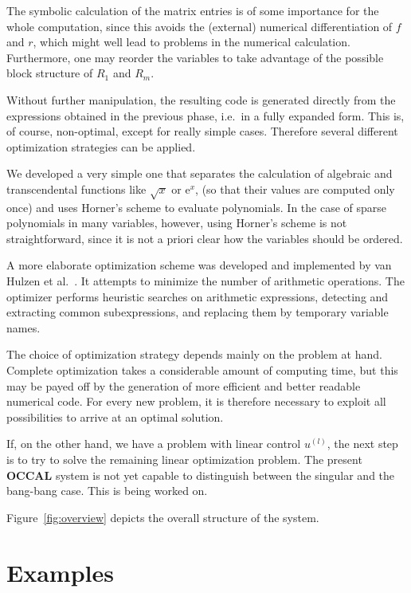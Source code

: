 \documentclass[12pt,a4paper]{article}
\newcommand{\OCCAL}{{\sf\bf OCCAL}}
\begin{document}
The symbolic calculation of the matrix entries is of some importance
for the whole computation, since this avoids the (external) numerical
differentiation of $f$ and $r$, which might well lead to problems in
the numerical calculation.  Furthermore, one may reorder the variables
to take advantage of the possible block structure of $R_{1}$ and
$R_{m}$.

Without further manipulation, the resulting code is generated directly
from the expressions obtained in the previous phase, i.e.\ in a fully
expanded form. This is, of course, non-optimal, except for really
simple cases.  Therefore several different optimization strategies can
be applied.

We developed a very simple one that separates the calculation of
algebraic and transcendental functions like $\sqrt {x}$ or ${\mathrm
e}^{x}$, (so that their values are computed only once) and uses
Horner's scheme to evaluate polynomials.  In the case of sparse
polynomials in many variables, however, using Horner's scheme is not
straightforward, since it is not a priori clear how the variables
should be ordered. 

A more elaborate optimization scheme was developed and implemented by
{\sc van Hulzen et al.}\ \cite{scope}. It attempts to minimize the
number of arithmetic operations. The optimizer performs heuristic
searches on arithmetic expressions, detecting and extracting common
subexpressions, and replacing them by temporary variable names.

The choice of optimization strategy depends mainly on the problem at
hand. Complete optimization takes a considerable amount of computing
time, but this may be payed off by the generation of more efficient
and better readable numerical code. For every new problem, it is
therefore necessary to exploit all possibilities to arrive at an
optimal solution.

If, on the other hand, we have a problem with linear control $u^{(l)}$,
the next step is to try to solve the remaining linear optimization
problem. The present \OCCAL{} system is not yet capable to distinguish
between the singular and the bang-bang case. This is being worked on.

Figure~\ref{fig:overview} depicts the overall structure of the system.


\section{Examples}
\end{document}
